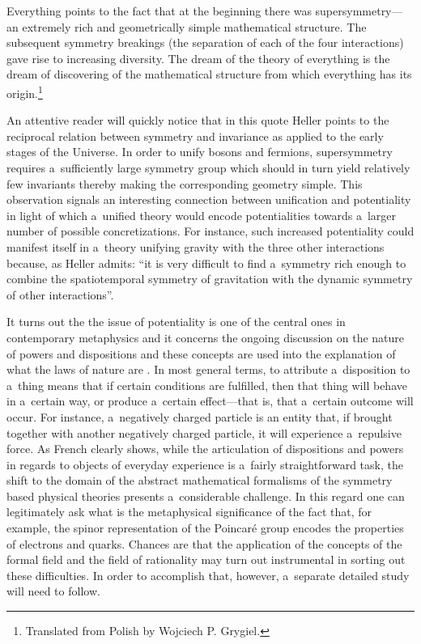 Everything points to the fact that at the beginning there was supersymmetry---an extremely rich and geometrically simple mathematical structure. The subsequent symmetry breakings (the separation of each of the four interactions) gave rise to increasing diversity. The dream of the theory of everything is the dream of discovering of the mathematical structure from which everything has its origin.\footnote{Translated from Polish by Wojciech P. Grygiel.}



An attentive reader will quickly notice that in this quote Heller points to the reciprocal relation between symmetry and invariance as applied to the early stages of the Universe. In order to unify bosons and fermions, supersymmetry requires a~sufficiently large symmetry group which should in turn yield relatively few invariants thereby making the corresponding geometry simple. This observation signals an interesting connection between unification and potentiality in light of which a~unified theory would encode potentialities towards a~larger number of possible concretizations. For instance, such increased potentiality could manifest itself in a~theory unifying gravity with the three other interactions because, as Heller 
\parencite*[][p.63]{heller_poczatek_2002} %
 admits: ``it is very difficult to find a~symmetry rich enough to combine the spatiotemporal symmetry of gravitation with the dynamic symmetry of other interactions''.



It turns out the the issue of potentiality is one of the central ones in contemporary metaphysics and it concerns the ongoing discussion on the nature of powers and dispositions and these concepts are used into the explanation of what the laws of nature are 
\parencite[e.g][]{friend_dispositions_2023}. %
 In most general terms, to attribute a~disposition to a~thing means that if certain conditions are fulfilled, then that thing will behave in a~certain way, or produce a~certain effect---that is, that a~certain outcome will occur. For instance, a~negatively charged particle is an entity that, if brought together with another negatively charged particle, it will experience a~repulsive force. As French 
\parencite*[][]{french_doing_2020} %
 clearly shows, while the articulation of dispositions and powers in regards to objects of everyday experience is a~fairly straightforward task, the shift to the domain of the abstract mathematical formalisms of the symmetry based physical theories presents a~considerable challenge. In this regard one can legitimately ask what is the metaphysical significance of the fact that, for example, the spinor representation of the Poincaré group encodes the properties of electrons and quarks. Chances are that the application of the concepts of the formal field and the field of rationality may turn out instrumental in sorting out these difficulties. In order to accomplish that, however, a~separate detailed study will need to follow.



